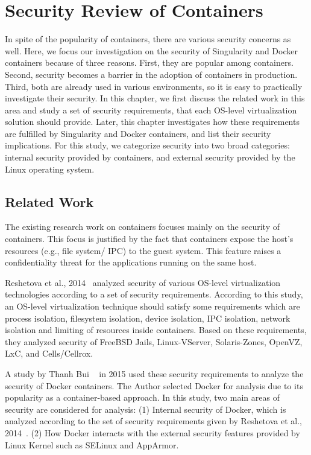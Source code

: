 \chapter{Security Review of Containers}\label{chapter2}	

In spite of the popularity of containers, there are various security
concerns as well. Here, we focus our investigation on the security
of Singularity and Docker containers because of three reasons.
First, they are popular among containers.
Second, security becomes a barrier in the adoption of containers in
production. Third, both are already
used in various environments, so it is easy to practically
investigate their security. 
In this chapter, we first discuss the related work in this area
and study a set of security
requirements, that each OS-level virtualization solution should provide.
Later, this chapter investigates how these requirements are fulfilled
by Singularity and Docker containers, and list their security implications.
For this study, we categorize security into two broad categories: internal
security provided by containers, and external security
provided by the Linux operating system.
\section{Related Work}

The existing research work on containers focuses mainly on the security of containers.
This focus is justified by the fact that containers expose the host's resources
(e.g., file system/ IPC) to the guest system. This feature raises a confidentiality
threat for the applications running on the same host. 

Reshetova et al., 2014~\cite{reshetova2014security} analyzed security of 
various OS-level virtualization technologies
according to a set of security requirements.
According to this study, an OS-level virtualization technique should satisfy
some requirements which are process isolation, filesystem isolation, device isolation,
IPC isolation, network isolation and limiting of resources inside containers.
Based on these requirements, they analyzed
security of FreeBSD Jails, Linux-VServer,
Solaris-Zones, OpenVZ, LxC, and Cells/Cellrox. 

A study by Thanh Bui ~\cite{bui2015analysis} in 2015 used these 
security requirements to analyze the security of Docker containers.
The Author selected Docker for analysis due to its popularity as a container-based approach.
In this study, two main areas of security are considered for analysis:
\newline
(1) Internal security of Docker, which is analyzed according to the
set of security requirements given by Reshetova et al., 2014~\cite{reshetova2014security}.
\newline
(2) How Docker interacts with the external security features provided
by Linux Kernel such as SELinux and AppArmor.

